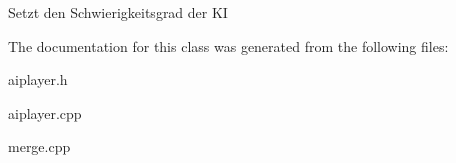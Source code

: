 Setzt den Schwierigkeitsgrad der K\-I 



The documentation for this class was generated from the following files\-:\begin{DoxyCompactItemize}
\item 
aiplayer.\-h\item 
aiplayer.\-cpp\item 
merge.\-cpp\end{DoxyCompactItemize}
